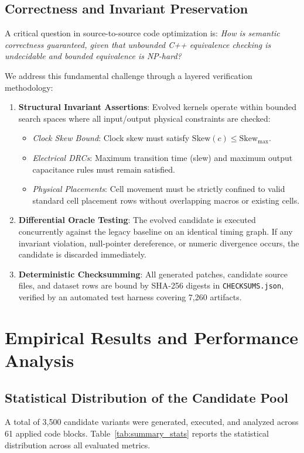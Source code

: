 \documentclass[10pt,twocolumn]{article}
\begin{document}
\subsection{Correctness and Invariant Preservation}
A critical question in source-to-source code optimization is: \textit{How is semantic correctness guaranteed, given that unbounded C++ equivalence checking is undecidable and bounded equivalence is NP-hard?}

We address this fundamental challenge through a layered verification methodology:
\begin{enumerate}
    \item \textbf{Structural Invariant Assertions}: Evolved kernels operate within bounded search spaces where all input/output physical constraints are checked:
    \begin{itemize}
        \item \textit{Clock Skew Bound}: Clock skew must satisfy $\text{Skew}(c) \le \text{Skew}_{\text{max}}$.
        \item \textit{Electrical DRCs}: Maximum transition time (slew) and maximum output capacitance rules must remain satisfied.
        \item \textit{Physical Placements}: Cell movement must be strictly confined to valid standard cell placement rows without overlapping macros or existing cells.
    \end{itemize}
    \item \textbf{Differential Oracle Testing}: The evolved candidate is executed concurrently against the legacy baseline on an identical timing graph. If any invariant violation, null-pointer dereference, or numeric divergence occurs, the candidate is discarded immediately.
    \item \textbf{Deterministic Checksumming}: All generated patches, candidate source files, and dataset rows are bound by SHA-256 digests in \texttt{CHECKSUMS.json}, verified by an automated test harness covering 7,260 artifacts.
\end{enumerate}

\section{Empirical Results and Performance Analysis}

\subsection{Statistical Distribution of the Candidate Pool}
A total of 3,500 candidate variants were generated, executed, and analyzed across 61 applied code blocks. Table~\ref{tab:summary_stats} reports the statistical distribution across all evaluated metrics.
\end{document}
